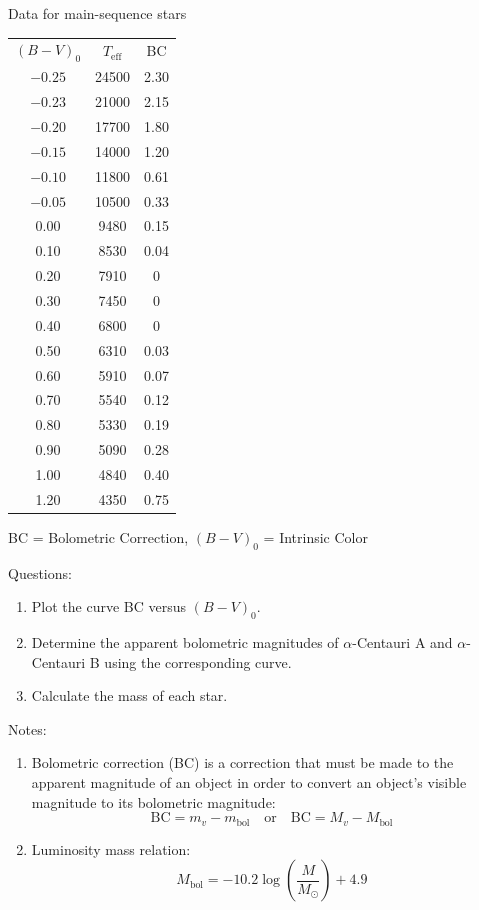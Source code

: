 \begin{center}
Data for main-sequence stars

\medskip
\begin{tabular}{ccc}
$(B-V)_0$ & $T_{\mathrm{eff}}$ & BC \\
$-0.25$ & 24500 & 2.30 \\
$-0.23$ & 21000 & 2.15 \\
$-0.20$ & 17700 & 1.80 \\
$-0.15$ & 14000 & 1.20 \\
$-0.10$ & 11800 & 0.61 \\
$-0.05$ & 10500 & 0.33 \\
0.00 & 9480 & 0.15 \\
0.10 & 8530 & 0.04 \\
0.20 & 7910 & 0 \\
0.30 & 7450 & 0 \\
0.40 & 6800 & 0 \\
0.50 & 6310 & 0.03 \\
0.60 & 5910 & 0.07 \\
0.70 & 5540 & 0.12 \\
0.80 & 5330 & 0.19 \\
0.90 & 5090 & 0.28 \\
1.00 & 4840 & 0.40 \\
1.20 & 4350 & 0.75 \\
\end{tabular}

\medskip
BC = Bolometric Correction, $(B-V)_0$ = Intrinsic Color
\end{center}

Questions:
\begin{enumerate}
\item Plot the curve BC versus $(B-V)_0$.
\item Determine the apparent bolometric magnitudes of $\alpha$-Centauri A
  and $\alpha$-Centauri B using the corresponding curve.
\item Calculate the mass of each star.
\end{enumerate}

Notes:
\begin{enumerate}
\item Bolometric correction (BC) is a correction that must be made to the
  apparent magnitude of an object in order to convert an object's visible
  magnitude to its bolometric magnitude:
  \[ \mathrm{BC} = m_v - m_{\mathrm{bol}} \quad \mbox{or} \quad
     \mathrm{BC} = M_v - M_{\mathrm{bol}} \]
\item Luminosity mass relation:
  \[ M_{\mathrm{bol}} = -10.2\log\left(\frac{M}{M_\odot}\right) + 4.9 \]
\end{enumerate}

